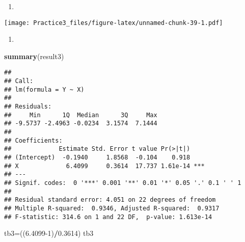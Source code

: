 \documentclass[
]{article}
\newenvironment{Shaded}{\begin{snugshade}}{\end{snugshade}}
\newcommand{\DataTypeTok}[1]{\textcolor[rgb]{0.13,0.29,0.53}{#1}}
\newcommand{\DecValTok}[1]{\textcolor[rgb]{0.00,0.00,0.81}{#1}}
\newcommand{\FloatTok}[1]{\textcolor[rgb]{0.00,0.00,0.81}{#1}}
\newcommand{\KeywordTok}[1]{\textcolor[rgb]{0.13,0.29,0.53}{\textbf{#1}}}
\newcommand{\NormalTok}[1]{#1}
\newcommand{\OperatorTok}[1]{\textcolor[rgb]{0.81,0.36,0.00}{\textbf{#1}}}
\begin{document}
\begin{enumerate}
\def\labelenumi{(\alph{enumi})}
\setcounter{enumi}{3}
\item
\end{enumerate}

\begin{Shaded}
\end{Shaded}

\texttt{[image: Practice3\_files/figure-latex/unnamed-chunk-39-1.pdf]}

\begin{enumerate}
\def\labelenumi{(\alph{enumi})}
\setcounter{enumi}{4}
\item
\end{enumerate}

\begin{Shaded}
\begin{Highlighting}[]
\KeywordTok{summary}\NormalTok{(result3)}
\end{Highlighting}
\end{Shaded}

\begin{verbatim}
## 
## Call:
## lm(formula = Y ~ X)
## 
## Residuals:
##     Min      1Q  Median      3Q     Max 
## -9.5737 -2.4963 -0.0234  3.1574  7.1444 
## 
## Coefficients:
##             Estimate Std. Error t value Pr(>|t|)    
## (Intercept)  -0.1940     1.8568  -0.104    0.918    
## X             6.4099     0.3614  17.737 1.61e-14 ***
## ---
## Signif. codes:  0 '***' 0.001 '**' 0.01 '*' 0.05 '.' 0.1 ' ' 1
## 
## Residual standard error: 4.051 on 22 degrees of freedom
## Multiple R-squared:  0.9346, Adjusted R-squared:  0.9317 
## F-statistic: 314.6 on 1 and 22 DF,  p-value: 1.613e-14
\end{verbatim}

\begin{Shaded}
\begin{Highlighting}[]
\NormalTok{tb3=((}\FloatTok{6.4099}\DecValTok{-1}\NormalTok{)}\OperatorTok{/}\FloatTok{0.3614}\NormalTok{)}
\NormalTok{tb3}
\end{Highlighting}
\end{Shaded}
\end{document}
